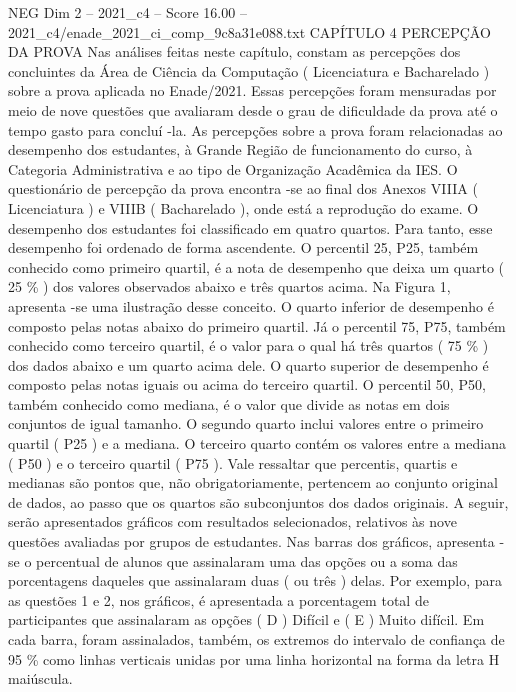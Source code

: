 \begin{textsample}{NEG Dim 2 – 2021\_c4 – Score 16.00 – 2021\_c4/enade\_2021\_ci\_comp\_9c8a31e088.txt}  \label{ex:f2_neg_397}
CAPÍTULO 4 PERCEPÇÃO DA PROVA Nas análises feitas neste capítulo, constam as percepções dos concluintes da Área de Ciência da Computação ( Licenciatura e Bacharelado ) sobre a prova aplicada no Enade/2021.
Essas percepções foram mensuradas por meio de nove questões que avaliaram desde o grau de dificuldade da prova até o tempo gasto para concluí -la.
As percepções sobre a prova foram relacionadas ao desempenho dos estudantes, à Grande Região de funcionamento do curso, à Categoria Administrativa e ao tipo de Organização Acadêmica da IES.
O questionário de percepção da prova encontra -se ao final dos Anexos VIIIA ( Licenciatura ) e VIIIB ( Bacharelado ), onde está a reprodução do exame.
O desempenho dos estudantes foi classificado em quatro quartos.
Para tanto, esse desempenho foi ordenado de forma ascendente.
O percentil 25, P25, também conhecido como primeiro quartil, é a nota de desempenho que deixa um quarto ( 25 \% ) dos valores observados abaixo e três quartos acima.
Na Figura 1, apresenta -se uma ilustração desse conceito.
O quarto inferior de desempenho é composto pelas notas abaixo do primeiro quartil.
Já o percentil 75, P75, também conhecido como terceiro quartil, é o valor para o qual há três quartos ( 75 \% ) dos dados abaixo e um quarto acima dele.
O quarto superior de desempenho é composto pelas notas iguais ou acima do terceiro quartil.
O percentil 50, P50, também conhecido como mediana, é o valor que divide as notas em dois conjuntos de igual tamanho.
O segundo quarto inclui valores entre o primeiro quartil ( P25 ) e a mediana.
O terceiro quarto contém os valores entre a mediana ( P50 ) e o terceiro quartil ( P75 ).
Vale ressaltar que percentis, quartis e medianas são pontos que, não obrigatoriamente, pertencem ao conjunto original de dados, ao passo que os quartos são subconjuntos dos dados originais.
A seguir, serão apresentados gráficos com resultados selecionados, relativos às nove questões avaliadas por grupos de estudantes.
Nas barras dos gráficos, apresenta -se o percentual de alunos que assinalaram uma das opções ou a soma das porcentagens daqueles que assinalaram duas ( ou três ) delas.
Por exemplo, para as questões 1 e 2, nos gráficos, é apresentada a porcentagem total de participantes que assinalaram as opções ( D ) Difícil e ( E ) Muito difícil.
Em cada barra, foram assinalados, também, os extremos do intervalo de confiança de 95 \% como linhas verticais unidas por uma linha horizontal na forma da letra H maiúscula.

\end{textsample}
